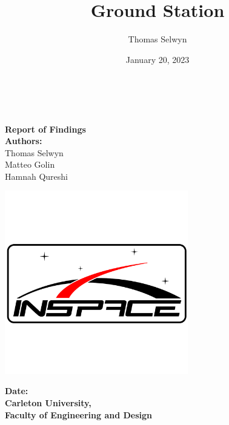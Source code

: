 \title{Ground Station}
\author{Thomas Selwyn}
\date{January 20, 2023}

\makeatletter
    \begin{titlepage}
        \begin{center}
        {}
        {\fontsize{34}{50}\selectfont \bf \@title}\\ 
	    {\ \\}
        \vbox{}\vspace{5cm}
            \centering
            {\bf\Large Report of Findings}\\[3cm] 
            {\large \textbf{Authors:}\\}
            {\large Thomas Selwyn\\}
            {\large Matteo Golin\\}
            {\large Hamnah Qureshi\\}
            \begin{center}
                \includegraphics[width=8cm]{images/cuinspace_logo.png}
            \end{center}
            {\large \textbf{Date:} \@date\\}
            {\large \textbf{Carleton University,}\\}
            {\large \textbf{Faculty of Engineering and Design}\\}
        \end{center}
    \end{titlepage}
\makeatother